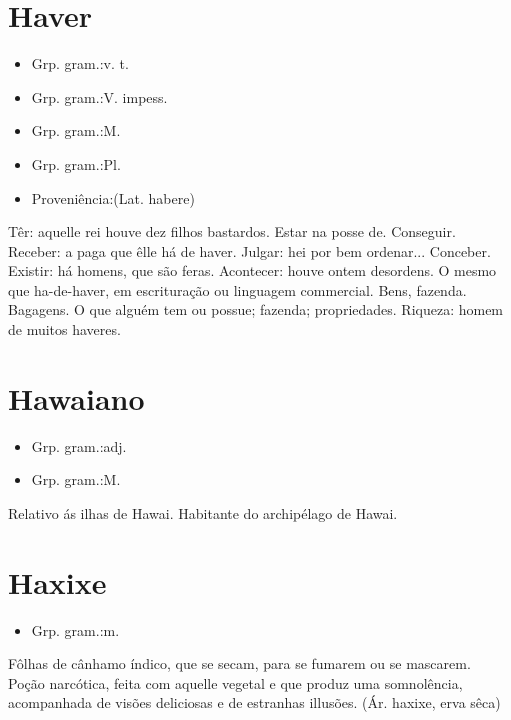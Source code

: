 \documentclass{article}
\begin{document}
\section{Haver}
\begin{itemize}
\item {Grp. gram.:v. t.}
\end{itemize}
\begin{itemize}
\item {Grp. gram.:V. impess.}
\end{itemize}
\begin{itemize}
\item {Grp. gram.:M.}
\end{itemize}
\begin{itemize}
\item {Grp. gram.:Pl.}
\end{itemize}
\begin{itemize}
\item {Proveniência:(Lat. \textunderscore habere\textunderscore )}
\end{itemize}
Têr: \textunderscore aquelle rei houve dez filhos bastardos\textunderscore .
Estar na posse de.
Conseguir.
Receber: \textunderscore a paga que êlle há de haver\textunderscore .
Julgar: \textunderscore hei por bem ordenar...\textunderscore 
Conceber.
Existir: \textunderscore há homens, que são feras\textunderscore .
Acontecer: \textunderscore houve ontem desordens\textunderscore .
O mesmo que \textunderscore ha-de-haver\textunderscore , em escrituração ou linguagem commercial.
Bens, fazenda.
Bagagens.
O que alguém tem ou possue; fazenda; propriedades.
Riqueza: \textunderscore homem de muitos haveres\textunderscore .
\section{Hawaiano}
\begin{itemize}
\item {Grp. gram.:adj.}
\end{itemize}
\begin{itemize}
\item {Grp. gram.:M.}
\end{itemize}
Relativo ás ilhas de Hawai.
Habitante do archipélago de Hawai.
\section{Haxixe}
\begin{itemize}
\item {Grp. gram.:m.}
\end{itemize}
Fôlhas de cânhamo índico, que se secam, para se fumarem ou se mascarem.
Poção narcótica, feita com aquelle vegetal e que produz uma somnolência, acompanhada de visões deliciosas e de estranhas illusões.
(Ár. \textunderscore haxixe\textunderscore , erva sêca)
\end{document}
